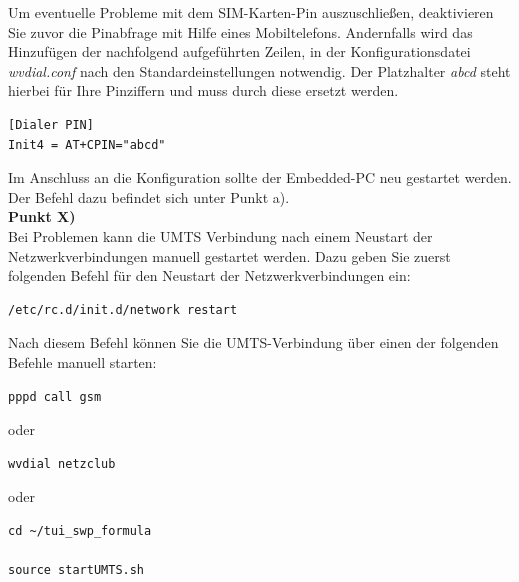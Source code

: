 \documentclass[fontsize = 12pt, paper = a4]{scrreprt}
\begin{document}
Um eventuelle Probleme mit dem SIM-Karten-Pin auszuschließen, deaktivieren Sie zuvor die Pinabfrage mit Hilfe eines Mobiltelefons. Andernfalls wird das Hinzufügen der nachfolgend aufgeführten Zeilen, in der Konfigurationsdatei \textit{wvdial.conf} nach den Standardeinstellungen notwendig. Der Platzhalter \textit{abcd} steht hierbei für Ihre Pinziffern und muss durch diese ersetzt werden.

\newpage

\begin{lstlisting}[frame=single]
[Dialer PIN]
Init4 = AT+CPIN="abcd"
\end{lstlisting} 
\vspace*{-2mm}

Im Anschluss an die Konfiguration sollte der Embedded-PC neu gestartet werden. Der Befehl dazu befindet sich unter Punkt a). \\

\textbf{Punkt X)} \\

Bei Problemen kann die UMTS Verbindung nach einem Neustart der Netzwerkverbindungen manuell gestartet werden.
Dazu geben Sie zuerst folgenden Befehl für den Neustart der Netzwerkverbindungen ein:

\vspace*{4mm}
\begin{lstlisting}[frame=single]
/etc/rc.d/init.d/network restart 
\end{lstlisting} 
\vspace*{-2mm}

Nach diesem Befehl können Sie die UMTS-Verbindung über einen der folgenden Befehle manuell starten:

\vspace*{4mm}
\begin{lstlisting}[frame=single]
pppd call gsm   
\end{lstlisting} 
\vspace*{-2mm}

oder

\vspace*{4mm}
\begin{lstlisting}[frame=single]
wvdial netzclub 
\end{lstlisting} 
\vspace*{-2mm}

oder 

\vspace*{4mm}
\begin{lstlisting}[frame=single]
cd ~/tui_swp_formula

source startUMTS.sh	
\end{lstlisting} 
\vspace*{-2mm}
\end{document}
